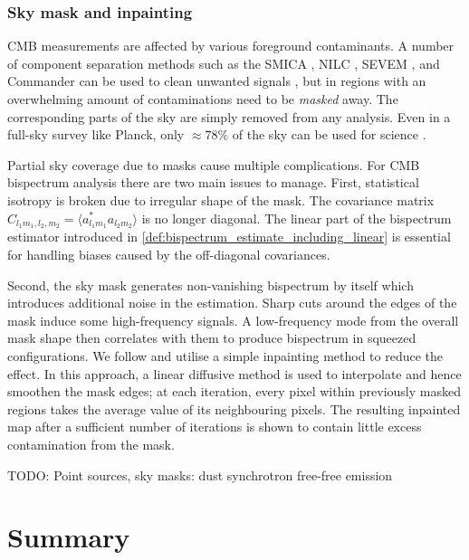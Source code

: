 \subsubsection*{Sky mask and inpainting}

CMB measurements are affected by various foreground contaminants. A number of component separation methods such as the SMICA \cite{Cardoso2008component}, NILC \cite{Basak2012nilc}, SEVEM \cite{Martinez2003sevem}, and Commander \cite{Eriksen2008commander} can be used to clean unwanted signals \cite{PlanckCollaboration2018component}, but in regions with an overwhelming amount of contaminations need to be \textit{masked} away. The corresponding parts of the sky are simply removed from any analysis. Even in a full-sky survey like Planck, only $\approx 78\%$ of the sky can be used for science \cite{PlanckCollaboration2018component}.

Partial sky coverage due to masks cause multiple complications. For CMB bispectrum analysis there are two main issues to manage. First, statistical isotropy is broken due to irregular shape of the mask. The covariance matrix $C_{l_1 m_1, l_2, m_2} = \langle a^*_{l_1 m_1} a_{l_2 m_2} \rangle$ is no longer diagonal. The linear part of the bispectrum estimator introduced in \eqref{def:bispectrum_estimate_including_linear} is essential for handling biases caused by the off-diagonal covariances.

Second, the sky mask generates non-vanishing bispectrum by itself which introduces additional noise in the estimation. Sharp cuts around the edges of the mask induce some high-frequency signals. A low-frequency mode from the overall mask shape then correlates with them to produce bispectrum in squeezed configurations. We follow \cite{Gruetjen2017inpainting} and utilise a simple inpainting method to reduce the effect. In this approach, a linear diffusive method is used to interpolate and hence smoothen the mask edges; at each iteration, every pixel within previously masked regions takes the average value of its neighbouring pixels. The resulting inpainted map after a sufficient number of iterations is shown to contain little excess contamination from the mask. 

TODO: Point sources, sky masks: dust synchrotron free-free emission


\section*{Summary}

